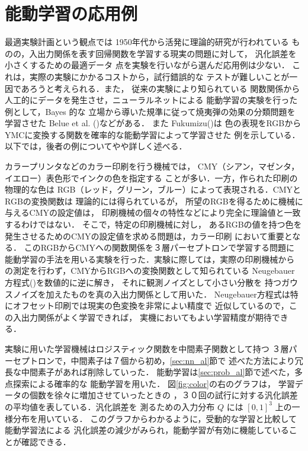 \documentclass[master]{cimt}
\begin{document}

\section{能動学習の応用例}
\label{sec:application}
最適実験計画という観点では
1950年代から活発に理論的研究が行われている
ものの，入出力関係を表す回帰関数を学習する現実の問題に対して，
汎化誤差を小さくするための最適データ
点を実験を行いながら選んだ応用例は少ない．
これは，実際の実験にかかるコストから，試行錯誤的な
テストが難しいことが一因であろうと考えられる．また，
従来の実験により知られている
関数関係から人工的にデータを発生させ，ニューラルネットによる
能動学習の実験を行った例として，Bayes 的な
立場から導いた規準に従って焼夷弾の効果の分類問題を学習させた 
Belue et al. (\cite{Belue97})などがある．
また Fukumizu(\cite{fuku_al_ieee})は
色の表現をRGBからYMCに変換する関数を確率的な能動学習によって学習させた
例を示している．
以下では，後者の例についてやや詳しく述べる．

カラープリンタなどのカラー印刷を行う機械では，
CMY（シアン，マゼンタ，イエロー）表色形でインクの色を指定する
ことが多い．一方，作られた印刷の物理的な色は
RGB（レッド，グリーン，ブルー）によって表現される．CMYとRGBの変換関数は
理論的には得られているが，
所望のRGBを得るために機械に与えるCMYの設定値は，
印刷機械の個々の特性などにより完全に理論値と一致するわけではない．
そこで，特定の印刷機械に対し，
あるRGBの値を持つ色を発生させるためのCMYの設定値を求める問題は，カラー印刷
において重要となる．
このRGBからCMYへの関数関係を３層パーセプトロンで学習する問題に
能動学習の手法を用いる実験を行った．実験に際しては，実際の印刷機械から
の測定を行わず，CMYからRGBへの変換関数として知られている 
Neugebauer 方程式(\cite{color})を数値的に逆に解き，
それに観測ノイズとして小さい分散を
持つガウスノイズを加えたものを真の入出力関係として用いた．
Neugebauer方程式は特にオフセット印刷では現実の色変換を非常によい精度で
近似しているので，この入出力関係がよく学習できれば，
実機においてもよい学習精度が期待できる．

実験に用いた学習機械はロジスティック関数を中間素子関数として持つ
３層パーセプトロンで，中間素子は７個から初め，\ref{sec:nn_al}節で
述べた方法により冗長な中間素子があれば削除していった．
能動学習は\ref{sec:prob_al}節で述べた，多点探索による確率的な
能動学習を用いた．
図\ref{fig:color}の右のグラフは，
学習データの個数を徐々に増加させていったときの
，３０回の試行に対する汎化誤差の平均値を表している．汎化誤差を
測るための入力分布 $Q$ には $[0,1]^3$ 上の一様分布を用いている．
このグラフからわかるように，受動的な学習と比較して能動学習法による
汎化誤差の減少がみられ，能動学習が有効に機能していることが確認できる．
\end{document}
